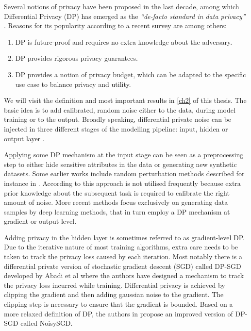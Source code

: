 Several notions of privacy have been proposed in the last decade, among which Differential Privacy (DP) has emerged as the \textit{``de-facto standard in data privacy''} \parencite{kim2021survey}. Reasons for its popularity according to a recent survey \parencite{surv_dp2021} are among others:

\begin{enumerate}
    \item DP is future-proof and requires no extra knowledge about the adversary.
    \item DP provides rigorous privacy guarantees.
    \item DP provides a notion of privacy budget, which can be adapted to the specific use case to balance privacy and utility.
\end{enumerate}

We will visit the definition and most important results in \cref{ch2} of this thesis. The basic idea is to add calibrated, random noise either to the data, during model training or to the output. Broadly speaking, differential private noise can be injected in three different stages of the modelling pipeline: input, hidden or output layer \parencite[cf.][]{zhao2019differential}. 

Applying some DP mechanism at the input stage can be seen as a preprocessing step to either hide sensitive attributes in the data or generating new synthetic datasets. Some earlier works include random perturbation methods described for instance in \parencite{input_levelDP,erm_dp_input}. According to \parencite{wang2023differential} this approach is not utilised frequently because extra prior knowledge about the subsequent task is required to calibrate the right amount of noise. More recent methods focus exclusively on generating data samples by deep learning methods, that in turn employ a DP mechanism at gradient or output level. 

Adding privacy in the hidden layer is sometimes referred to as gradient-level DP. Due to the iterative nature of most training algorithms, extra care needs to be taken to track the privacy loss caused by each iteration. Most notably there is a differential private version of stochastic gradient descent (SGD) called DP-SGD developed by Abadi et al \parencite{Abadi_2016} where the authors have designed a mechanism to track the privacy loss incurred while training. Differential privacy is achieved by clipping the gradient and then adding gaussian noise to the gradient. The clipping step is necessary to ensure that the gradient is bounded. Based on a more relaxed definition of DP, the authors in \parencite{bu2020deep} propose an improved version of DP-SGD called NoisySGD. 


